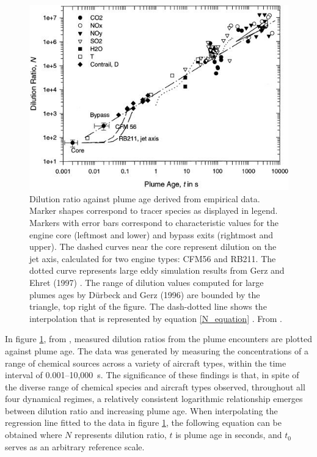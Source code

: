 \begin{figure}[H]
 \centering
 \includegraphics[width=0.8\linewidth]{Schumann_fig.jpg}
 \caption{Dilution ratio against plume age derived from empirical data. Marker shapes correspond to tracer species as displayed in legend. Markers with error bars correspond to characteristic values for the engine core (leftmost and lower) and bypass exits (rightmost and upper). The dashed curves near the core represent dilution on the jet axis, calculated for two engine types: CFM56 and RB211. The dotted curve represents large eddy simulation results from Gerz and Ehret (1997) \cite{Gerz1997}. The range of dilution values computed for large plumes ages by D{\"u}rbeck and Gerz (1996) \cite{Durbeck1996} are bounded by the triangle, top right of the figure. The dash-dotted line shows the interpolation that is represented by equation \eqref{N_equation} \cite{Schumann1998}. From \cite{}.}
 \label{Schumann_dilution}
 \end{figure}

In figure \ref{Schumann_dilution}, from \cite{} , measured dilution ratios from the plume encounters are plotted against plume age. The data was generated by measuring the concentrations of a range of chemical sources across a variety of aircraft types, within the time interval of 0.001--10,000~s. The significance of these findings is that, in spite of the diverse range of chemical species and aircraft types observed, throughout all four dynamical regimes, a relatively consistent logarithmic relationship emerges between dilution ratio and increasing plume age. When interpolating the regression line fitted to the data in figure \ref{Schumann_dilution}, the following equation can be obtained where $N$ represents dilution ratio, $t$ is plume age in seconds, and $t_0$ serves as an arbitrary reference scale.

